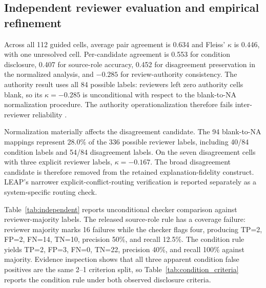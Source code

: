 \documentclass[a4paper,fleqn]{cas-dc}
\begin{document}
\subsection{Independent reviewer evaluation and empirical refinement}
Across all 112 guided cells, average pair agreement is 0.634 and Fleiss' $\kappa$ is 0.446, with one unresolved cell. Per-candidate agreement is 0.553 for condition disclosure, 0.407 for source-role accuracy, 0.452 for disagreement preservation in the normalized analysis, and $-0.285$ for review-authority consistency. The authority result uses all 84 possible labels: reviewers left zero authority cells blank, so its $\kappa=-0.285$ is unconditional with respect to the blank-to-NA normalization procedure. The authority operationalization therefore fails inter-reviewer reliability \citep{Fleiss1971}.

Normalization materially affects the disagreement candidate. The 94 blank-to-NA mappings represent 28.0\% of the 336 possible reviewer labels, including 40/84 condition labels and 54/84 disagreement labels. On the seven disagreement cells with three explicit reviewer labels, $\kappa=-0.167$. The broad disagreement candidate is therefore removed from the retained explanation-fidelity construct. LEAP's narrower explicit-conflict-routing verification is reported separately as a system-specific routing check.

Table~\ref{tab:independent} reports unconditional checker comparison against reviewer-majority labels. The released source-role rule has a coverage failure: reviewer majority marks 16 failures while the checker flags four, producing TP=2, FP=2, FN=14, TN=10, precision 50\%, and recall 12.5\%. The condition rule yields TP=2, FP=3, FN=0, TN=22, precision 40\%, and recall 100\% against majority. Evidence inspection shows that all three apparent condition false positives are the same 2--1 criterion split, so Table~\ref{tab:condition_criteria} reports the condition rule under both observed disclosure criteria.
\end{document}
